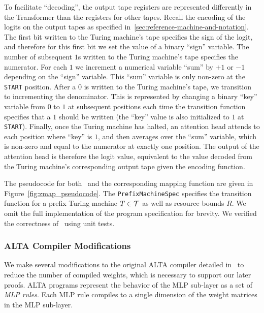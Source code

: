 To facilitate ``decoding'', the output tape registers are represented differently in the Transformer than the registers for other tapes. Recall the encoding of the logits on the output tapes as specified in~\ref{sec:reference-machine-and-notation}. The first bit written to the Turing machine's tape specifies the sign of the logit, and therefore for this first bit we set the value of a binary ``sign'' variable. The number of subsequent $1$s written to the Turing machine's tape specifies the numerator. For each $1$ we increment a numerical variable ``sum'' by $+1$ or $-1$ depending on the ``sign'' variable. This ``sum'' variable is only non-zero at the \texttt{START} position. After a $0$ is written to the Turing machine's tape, we transition to incrementing the denominator. This is represented by changing a binary ``key'' variable from $0$ to $1$ at subsequent positions each time the transition function specifies that a $1$ should be written (the ``key'' value is also initialized to $1$ at \texttt{START}). Finally, once the Turing machine has halted, an attention head attends to each position where ``key'' is $1$, and then averages over the ``sum'' variable, which is non-zero and equal to the numerator at exactly one position. The output of the attention head is therefore the logit value, equivalent to the value decoded from the Turing machine's corresponding output tape given the encoding function.



The pseudocode for both \zmap~and the corresponding mapping function are given in Figure~\ref{fig:zmap_pseudocode}. The \texttt{PrefixMachineSpec} specifies the transition function for a prefix Turing machine $T \in {\mathcal{T}}$ as well as resource bounds $R$. We omit the full implementation of the program specification for brevity. We verified the correctness of \zmap~using unit tests.

\subsubsection{ALTA Compiler Modifications}

We make several modifications to the original ALTA compiler detailed in~\citet{shaw2024alta} to reduce the number of compiled weights, which is necessary to support our later proofs. ALTA programs represent the behavior of the MLP sub-layer as a set of \emph{MLP rules}. Each MLP rule compiles to a single dimension of the weight matrices in the MLP sub-layer. 

